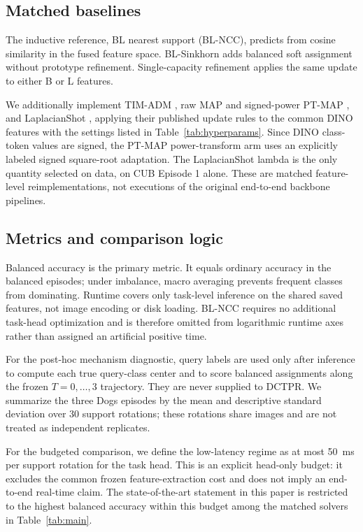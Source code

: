 \documentclass[]{spie}
\newcommand{\method}{\textsc{DCTPR}\xspace}
\begin{document}
\subsection{Matched baselines}

The inductive reference, BL nearest support (BL-NCC), predicts from cosine
similarity in the fused feature space. BL-Sinkhorn adds balanced soft assignment
without prototype refinement. Single-capacity refinement applies the same update
to either B or L features.

We additionally implement TIM-ADM \cite{tim}, raw MAP and signed-power PT-MAP
\cite{ptmap}, and LaplacianShot \cite{laplacianshot}, applying their published
update rules to the common DINO features with the settings listed in
Table~\ref{tab:hyperparams}. Since DINO class-token values are signed, the
PT-MAP power-transform arm uses an explicitly labeled signed square-root
adaptation. The LaplacianShot lambda is the only quantity selected on data, on
CUB Episode 1 alone. These are matched feature-level reimplementations, not
executions of the original end-to-end backbone pipelines.

\subsection{Metrics and comparison logic}

Balanced accuracy is the primary metric. It equals ordinary accuracy in the
balanced episodes; under imbalance, macro averaging prevents frequent classes
from dominating. Runtime covers only task-level inference on the shared saved
features, not image encoding or disk loading. BL-NCC requires no additional
task-head optimization and is therefore omitted from logarithmic runtime axes
rather than assigned an artificial positive time.

For the post-hoc mechanism diagnostic, query labels are used only after
inference to compute each true query-class center and to score balanced
assignments along the frozen $T=0,\ldots,3$ trajectory. They are never supplied
to \method. We summarize the three Dogs episodes by the mean and descriptive
standard deviation over 30 support rotations; these rotations share images and
are not treated as independent replicates.

For the budgeted comparison, we define the low-latency regime as at most
50~ms per support rotation for the task head. This is an explicit head-only
budget: it excludes the common frozen feature-extraction cost and does not imply
an end-to-end real-time claim. The state-of-the-art statement in this paper is
restricted to the highest balanced accuracy within this budget among the
matched solvers in Table~\ref{tab:main}.
\end{document}

